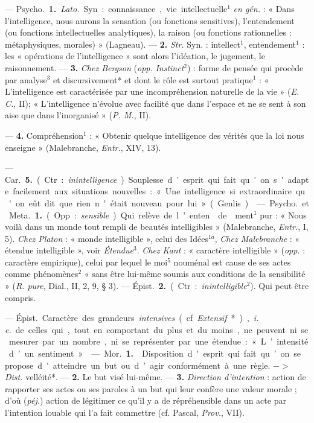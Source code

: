 \begin{itemize}[leftmargin=1cm, label=, itemsep=1pt]
 —  \si{Psycho.} {\bf 1.} {\it Lato.} Syn. :
connaissance, vie intellectuelle$^1$ {\it en gén.} : « Dans l'intelligence,
nous aurons la sensation (ou fonctions sensitives), l’entendement (ou
fonctions intellectuelles analytiques), la raison (ou fonctions
rationnelles : métaphysiques, morales) » (Lagneau). — {\bf 2.} {\it Str.}
Syn. : intellect$^1$, entendement$^1$ : les « opérations de l'intelligence »
sont alors l’idéation, le jugement, le raisonnement. —  {\bf 3.} {\it Chez
Bergson} ({\it opp.} {\it Instinct}$^2$) : forme de pensée qui procède par
analyse$^3$ et discursivement* et dont le rôle est surtout pratique$^1$ :
« L’intelligence est caractérisée par une incompréhension naturelle de la
vie » ({\it E. C.}, II); « L'intelligence n’évolue avec facilité que dans
l’espace et ne se sent à son aise que dans l'inorganisé » ({\it P. M.}, II).

—  {\bf 4.} Compréhension$^1$ : « Obtenir quelque intelligence
des vérités que la loi nous enseigne » (Malebranche, {\it Entr.},
{\footnotesize XIV}, 13).

— \si{Car.} {\bf 5.} (Ctr. : {\it inintelligence}). Souplesse d’esprit qui
fait qu'on s'adapte facilement aux situations nouvelles : « ... Une
intelligence si extraordinaire qu'on eût dit que rien n'était nouveau pour
lui » (Genlis).

 — \si{Psycho.} et \si{Meta.} {\bf 1.} (Opp. :
{\it sensible}). Qui relève de l’enten\-de\-ment$^1$ pur : « Nous voilà dans un
monde tout rempli de beautés intelligibles » (Malebranche, {\it Entr.}, I,
5). {\it Chez Platon} : « monde intelligible », celui des Idées$^{1a}$,
{\it Chez Malebranche} : « étendue intelligible », voir {\it Étendue}$^3$.
{\it Chez Kant} : « caractère intelligible » ({\it opp.} : caractère
empirique), celui par lequel le moi$^5$ nouménal est cause de ses actes comme
phénomènes$^2$ « sans être lui-même soumis aux conditions de la
sensibilité » ({\it R. pure}, Dial., II, 2, 9, § 3). — \si{Épist.} {\bf 2.}
(Ctr. : {\it inintelligible}$^2$). Qui peut être compris.

 — \si{Épist.} Caractère des grandeurs {\it intensives} (cf.
{\it Extensif}*), {\it i. e.} de celles qui, tout en comportant du plus et du
moins, ne peuvent ni se mesurer par un nombre, ni se représenter par une
étendue : « L’intensité d’un sentiment ».

 — \si{Mor.} {\bf 1.}  Disposition d'esprit qui
fait qu’on se propose d'atteindre un but ou d’agir conformément à une règle.
$->$ {\it Dist.} velléité*. — {\bf 2.}  Le but visé lui-même.
— {\bf 3.} {\it Direction d'intention} : action de rapporter ses actes ou ses
paroles à un but qui leur confère une valeur morale ; d’où ({\it péj.})
action de légitimer ce qu'il y a de répréhensible dans un acte par
l'intention louable qui l'a fait commettre (cf. Pascal, {\it Prov.}, VII).


\end{itemize}
